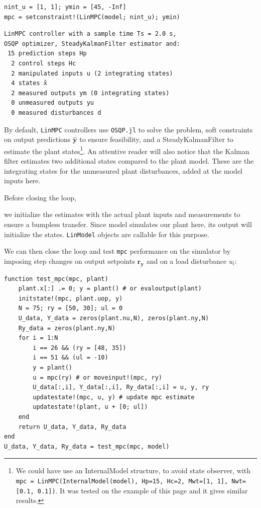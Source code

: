 \begin{verbatim}
nint_u = [1, 1]; ymin = [45, -Inf]
mpc = setconstraint!(LinMPC(model; nint_u); ymin)
\end{verbatim}
\vspace{-25pt}
\begin{verbatim}
LinMPC controller with a sample time Ts = 2.0 s,
OSQP optimizer, SteadyKalmanFilter estimator and:
 15 prediction steps Hp
  2 control steps Hc
  2 manipulated inputs u (2 integrating states)
  4 states x̂
  2 measured outputs ym (0 integrating states)
  0 unmeasured outputs yu
  0 measured disturbances d
\end{verbatim}

By default, \texttt{LinMPC} controllers use \texttt{OSQP.jl} to solve the problem, soft constraints on output predictions $\mathbf{\hat y}$ to ensure feasibility, and a SteadyKalmanFilter to estimate the plant states\footnote{We could have use an InternalModel structure, to avoid state observer, with \texttt{mpc = LinMPC(InternalModel(model), Hp=15, Hc=2, Mwt=[1, 1], Nwt=[0.1, 0.1])}. It was tested on the example of this page and it gives similar results.}. An attentive reader will also notice that the Kalman filter estimates two additional states compared to the plant model. These are the integrating states for the unmeasured plant disturbances, added at the model inputs here.  

Before closing the loop, 

we initialize the estimates with the actual plant inputs and measurements to ensure a bumpless transfer. Since model simulates our plant here, its output will initialize the states. \texttt{LinModel} objects are callable for this purpose. 

We can then close the loop and test \texttt{mpc} performance on the simulator by imposing step changes on output setpoints $\mathbf{r_y}$ and on a load disturbance $u_l$:

\begin{verbatim}
function test_mpc(mpc, plant)
    plant.x[:] .= 0; y = plant() # or evaloutput(plant)
    initstate!(mpc, plant.uop, y)
    N = 75; ry = [50, 30]; ul = 0
    U_data, Y_data = zeros(plant.nu,N), zeros(plant.ny,N)
    Ry_data = zeros(plant.ny,N)
    for i = 1:N
        i == 26 && (ry = [48, 35])
        i == 51 && (ul = -10)
        y = plant() 
        u = mpc(ry) # or moveinput!(mpc, ry)
        U_data[:,i], Y_data[:,i], Ry_data[:,i] = u, y, ry
        updatestate!(mpc, u, y) # update mpc estimate
        updatestate!(plant, u + [0; ul]) 
    end
    return U_data, Y_data, Ry_data
end
U_data, Y_data, Ry_data = test_mpc(mpc, model)
\end{verbatim}


